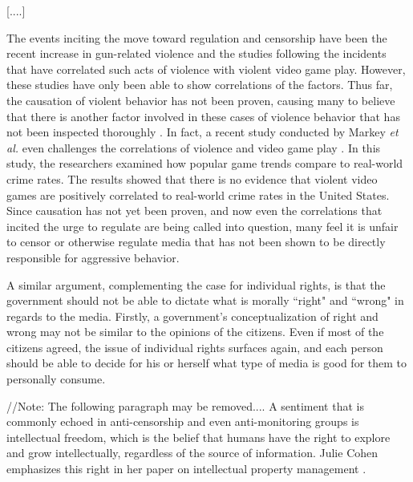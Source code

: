 [....]

The events inciting the move toward regulation and censorship have been the recent increase in gun-related violence and the studies following the incidents that have correlated such acts of violence with violent video game play. However, these studies have only been able to show correlations of the factors. Thus far, the causation of violent behavior has not been proven, causing many to believe that there is another factor involved in these cases of violence behavior that has not been inspected thoroughly \cite{ferguson2013, ferguson2008}. In fact, a recent study conducted by Markey \textit{et al.} even challenges the correlations of violence and video game play \cite{markey2014}. In this study, the researchers examined how popular game trends compare to real-world crime rates. The results showed that there is no evidence that violent video games are positively correlated to real-world crime rates in the United States. Since causation has not yet been proven, and now even the correlations that incited the urge to regulate are being called into question, many feel it is unfair to censor or otherwise regulate media that has not been shown to be directly responsible for aggressive behavior. 


A similar argument, complementing the case for individual rights, is that the government should not be able to dictate what is morally ``right" and ``wrong" in regards to the media. Firstly, a government's conceptualization of right and wrong may not be similar to the opinions of the citizens. Even if most of the citizens agreed, the issue of individual rights surfaces again, and each person should be able to decide for his or herself what type of media is good for them to personally consume.

//Note: The following paragraph may be removed....
A sentiment that is commonly echoed in anti-censorship and even anti-monitoring groups is intellectual freedom, which is the belief that humans have the right to explore and grow intellectually, regardless of the source of information. Julie Cohen emphasizes this right in her paper on intellectual property management \cite{cohen1995}.


